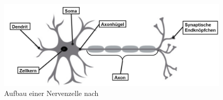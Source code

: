 \begin{figure}
    \centering
    \includegraphics[width=\textwidth]{papers/nerven/Bilder/NervenAufbau2.png}
    \caption{Aufbau einer Nervenzelle nach \cite{nerven:rosadu.}}
    \label{fig:Aufbau Nervenzelle}
\end{figure}

